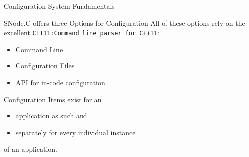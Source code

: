 ﻿

\begin{frame}[fragile]{Configuration System Fundamentals}
  \begin{block}{\alert{SNode.C} offers three Options for Configuration}
    All of these options rely on the excellent \href{https://github.com/CLIUtils/CLI11}{\texttt{\alert{CLI11:Command line parser for C++11}}}:
    \begin{itemize}
      \item Command Line
      \item Configuration Files
      \item API for in-code configuration
    \end{itemize}
    Configuration Items exist for an
    \begin{itemize}
      \item \alert{application as such} and
      \item separately for \alert{every individual instance}
    \end{itemize}
    of an application.
  \end{block}
\end{frame}
